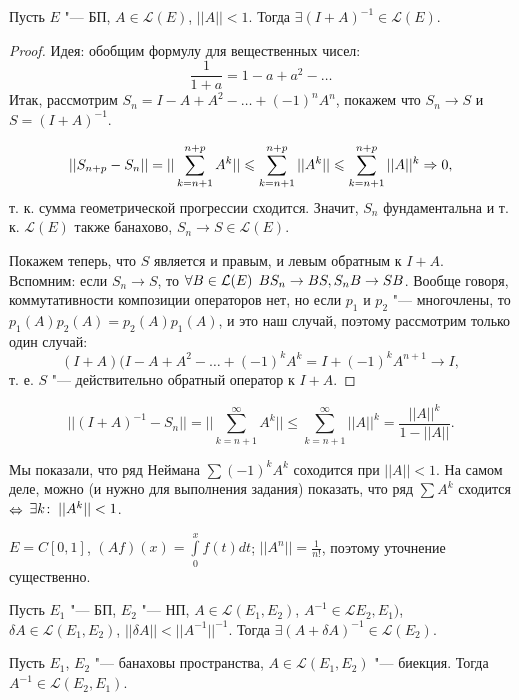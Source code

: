 \documentclass[main]{subfiles}
\begin{document}
\begin{theorem}
  Пусть \( E \) "--- БП, \( A \in \mathcal{L}(E) \),
  \( ||A|| < 1 \). Тогда \( \exists (I + A)^{-1} \in \mathcal{L}(E) \).
\end{theorem}
\begin{proof}
  Идея: обобщим формулу для вещественных чисел:
  \[ \frac{1}{1 + a} = 1 - a + a^2 - \dots \]
  Итак, рассмотрим \( S_n = I - A + A^2 - \dots + (-1)^n A^n \),
  покажем что \( S_n \to S \) и \( S = (I + A)^{-1} \).

  \[ ||S_{n + p} - S_n|| = ||\sum_{k = n + 1}^{n + p} A^k|| \leqslant
    \sum_{k = n + 1}^{n + p} ||A^k|| \leqslant \sum_{k = n + 1}^{n + p} ||A||^k
  \Rightarrow 0, \]
  т. к. сумма геометрической прогрессии сходится.
  Значит, \( { S_n} \) фундаментальна и т. к. \( \mathcal{L}(E) \)
  также банахово, \( S_n \to S \in \mathcal{L}(E) \).

  Покажем теперь, что \( S \) является и правым, и левым обратным к \( I + A \).
  Вспомним: если \( S_n \to S \), то \( \forall {B \in \mathcal{L}(E)} \; \, BS_n \to BS,
  S_n B \to SB \). Вообще говоря, коммутативности композиции операторов нет,
  но если \( p_1 \) и \( p_2 \) "--- многочлены, то
  \( p_1(A) p_2(A) = p_2(A) p_1(A) \), и это наш случай, поэтому рассмотрим только
  один случай:
  \[ (I + A)(I - A + A^2 - \dots + (-1)^k A^k =
  I + (-1)^k A^{n + 1} \to I, \]
  т. е. \( S \) "--- действительно обратный оператор к \( I + A \).
\end{proof}
\begin{corollary}
  \[ ||(I + A)^{-1} - S_n|| = ||\sum_{k = n + 1}^\infty A^k|| \le
  \sum_{k = n+1}^\infty ||A||^k = \frac{||A||^k}{1 - ||A||}. \]
\end{corollary}

\begin{remark}
  Мы показали, что ряд Неймана \( \sum (-1)^k A^k \) соходится при
  \( ||A|| < 1 \). На самом деле, можно (и нужно для выполнения задания)
  показать, что ряд \( \sum A^k \) сходится \( \Leftrightarrow \)
  \( \exists k \colon \: ||A^k|| < 1 \).
\end{remark}

\begin{example}
  \( E = C[0, 1] \), \( (Af)(x) = \int\limits_0^x f(t) dt \);
  \( ||A^n|| = \frac{1}{n!} \), поэтому уточнение существенно.
\end{example}

\begin{theorem}
  Пусть \( E_1 \) "--- БП, \( E_2 \) "--- НП,
  \( A \in \mathcal{L}(E_1, E_2) \),
  \( A^{-1} \in \mathcal{L}E_2, E_1) \),
  \( \delta A \in \mathcal{L}(E_1, E_2) \),
  \( ||\delta A|| < ||A^{-1}||^{-1} \).
  Тогда \( \exists {(A + \delta A)}^{-1} \in \mathcal{L}(E_2) \).
\end{theorem}

\begin{theorem}
  Пусть \( E_1 \), \( E_2 \) "--- банаховы пространства,
  \( A \in \mathcal{L}(E_1, E_2) \) "--- биекция.
  Тогда \( A^{-1} \in \mathcal{L}(E_2, E_1) \).
\end{theorem}
\end{document}
